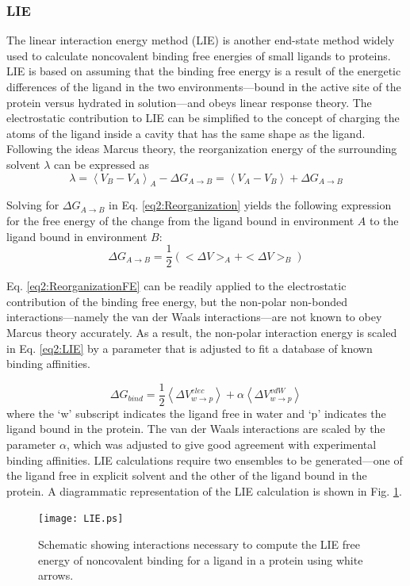 \subsubsection{LIE}

The linear interaction energy method (LIE) is another end-state method widely
used to calculate noncovalent binding free energies of small ligands to
proteins. LIE is based on assuming that the binding free energy is a result of
the energetic differences of the ligand in the two environments---bound in the
active site of the protein versus hydrated in solution---and obeys linear
response theory. \cite{Aqvist_ProteinEng_1994_v7_p385} The electrostatic
contribution to LIE can be simplified to the concept of charging the atoms of
the ligand inside a cavity that has the same shape as the ligand. Following the
ideas Marcus theory, \cite{Marcus1955} the reorganization energy of the
surrounding solvent $\lambda$ can be expressed as
\cite{Aqvist_ProteinEng_1994_v7_p385}
\begin{equation}
   \lambda = \left \langle V_B - V_A \right \rangle _ A - \Delta G _ {A
         \rightarrow B} = \left \langle V _ A - V _ B \right \rangle + \Delta G
         _ {A \rightarrow B}
   \label{eq2:Reorganization}
\end{equation}

Solving for $\Delta G _ {A \rightarrow B}$ in Eq. \ref{eq2:Reorganization}
yields the following expression for the free energy of the change from the
ligand bound in environment $A$ to the ligand bound in environment $B$:
\begin{equation}
   \Delta G _ {A \rightarrow B} = \frac 1 2 \left( < \Delta V > _ A + < \Delta V
               > _ B \right)
   \label{eq2:ReorganizationFE}
\end{equation}

Eq. \ref{eq2:ReorganizationFE} can be readily applied to the electrostatic
contribution of the binding free energy, but the non-polar non-bonded
interactions---namely the van der Waals interactions---are not known to obey
Marcus theory accurately. As a result, the non-polar interaction energy is
scaled in Eq. \ref{eq2:LIE} by a parameter that is adjusted to fit a database of
known binding affinities. \cite{Aqvist_ProteinEng_1994_v7_p385}

\begin{equation}
   \Delta G_{bind} = \frac 1 2 \left \langle \Delta V_{w \rightarrow p} ^{elec}
         \right \rangle + \alpha \left \langle \Delta V_{w \rightarrow p} ^{vdW}
         \right \rangle
   \label{eq2:LIE}
\end{equation}
where the `w' subscript indicates the ligand free in water and `p' indicates the
ligand bound in the protein. The van der Waals interactions are scaled by the
parameter $\alpha$, which was adjusted to give good agreement with experimental
binding affinities. LIE calculations require two ensembles to be generated---one
of the ligand free in explicit solvent and the other of the ligand bound in the
protein. A diagrammatic representation of the LIE calculation is shown in Fig.
\ref{fig2:LIE}.

\begin{figure}
   \texttt{[image: LIE.ps]}
   \caption{Schematic showing interactions necessary to compute the LIE free
            energy of noncovalent binding for a ligand in a protein using white
            arrows.}
   \label{fig2:LIE}
\end{figure}
